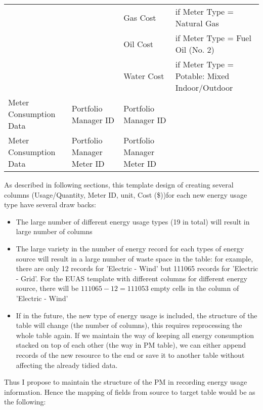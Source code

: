 \documentclass[12pt]{article}
\begin{document}
\begin{table}[h!]
\begin{tabular}{p{3cm}p{3cm}|p{3cm}|p{5cm}}
  \cline{3-4}
                       &                              & Gas Cost                     & if Meter Type = Natural Gas\\
  \cline{3-4}
                       &                              & Oil Cost                     & if Meter Type = Fuel Oil (No. 2)\\
  \cline{3-4}
                       &                              & Water Cost                   & if Meter Type = Potable: Mixed Indoor/Outdoor\\
  \hline
Meter Consumption Data & Portfolio Manager ID         & Portfolio Manager ID        &                             \\
  \hline
Meter Consumption Data & Portfolio Manager Meter ID   & Portfolio Manager Meter ID  &                             \\
  \hline
  \hline
\end{tabular}
\end{table}
As described in following sections, this template design of creating
several columns (Usage/Quantity, Meter ID, unit, Cost (\$))for each
new energy usage type have several draw backs:
\begin{itemize}
\item The large number of different energy usage types (19 in total)
  will result in large number of columns
\item The large variety in the number of energy record for each types
  of energy source will result in a large number of waste space in the
  table: for example, there are only 12 records for 'Electric - Wind'
  but 111065 records for 'Electric - Grid'. For the EUAS template with
  different columns for different energy source, there will be $111065
  - 12 = 111053$ empty cells in the column of 'Electric - Wind'
\item If in the future, the new type of energy usage is included, the
  structure of the table will change (the number of columns), this
  requires reprocessing the whole table again. If we maintain the way
  of keeping all energy consumption stacked on top of each other (the
  way in PM table), we can either append records of the new resource
  to the end or save it to another table without affecting the already
  tidied data.
\end{itemize}

Thus I propose to maintain the structure of the PM in recording energy
usage information. Hence the mapping of fields from source to target
table would be as the following:
\end{document}
